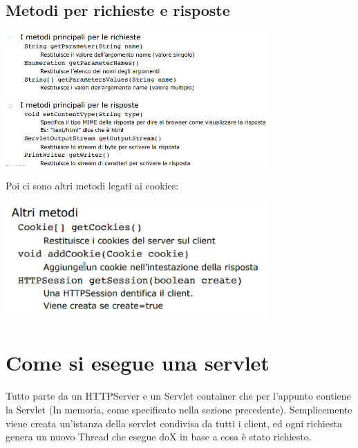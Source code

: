 \documentclass[12pt, a4paper, openany, twoside]{book}
\begin{document}
\subsection{Metodi per richieste e risposte}
\begin{center}
\includegraphics[width=0.75\textwidth]{7}
\end{center}
Poi ci sono altri metodi legati ai cookies:
\begin{center}
\includegraphics[width=0.75\textwidth]{8}
\end{center}
\section{Come si esegue una servlet}
Tutto parte da un HTTPServer e un Servlet container che per l'appunto contiene
la Servlet (In memoria, come specificato nella sezione precedente).
Semplicemente viene creata un'istanza della servlet condivisa da tutti i
client, ed ogni richiesta genera un nuovo Thread che esegue doX in base a 
cosa è stato richiesto.
\end{document}
